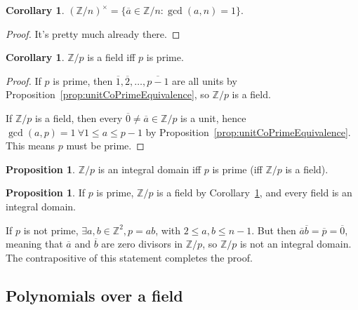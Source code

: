 \documentclass[12pt,a4paper]{article}
\theoremstyle{definition}
\newtheorem{proposition}[definition]{Proposition}
\newtheorem{corollary}[definition]{Corollary}
\begin{document}
\begin{corollary}
	${(\mathbb{Z} / n)}^{\times} = \{ \overline{a} \in \mathbb{Z} / n: \gcd(a, n) = 1 \}$.
\end{corollary}

\begin{proof}
	It's pretty much already there.
\end{proof}

\begin{corollary}\label{cor:primeRemaindersField}
	$\mathbb{Z} / p$ is a field iff $p$ is prime.
\end{corollary}

\begin{proof}
	If $p$ is prime, then $\overline{1}, \overline{2}, \dots, \overline{p - 1}$ are all units by Proposition~\ref{prop:unitCoPrimeEquivalence}, so $\mathbb{Z} / p$ is a field.

	If $\mathbb{Z} / p$ is a field, then every $\overline{0} \ne \overline{a} \in \mathbb{Z} / p$ is a unit, hence $\gcd(a, p) = 1 \ \forall 1 \le a \le p - 1$ by Proposition~\ref{prop:unitCoPrimeEquivalence}. This means $p$ must be prime.
\end{proof}

\begin{proposition}
	$\mathbb{Z} / p$ is an integral domain iff $p$ is prime (iff $\mathbb{Z} / p$ is a field).
\end{proposition}

\begin{proposition}
	If $p$ is prime, $\mathbb{Z} / p$ is a field by Corollary~\ref{cor:primeRemaindersField}, and every field is an integral domain.

	If $p$ is not prime, $\exists a, b \in \mathbb{Z}^2, p = ab$, with $2 \le a, b \le n - 1$. But then $\overline{a} \overline{b} = \overline{p} = \overline{0}$, meaning that $\overline{a}$ and $\overline{b}$ are zero divisors in $\mathbb{Z} / p$, so $\mathbb{Z} / p$ is not an integral domain. The contrapositive of this statement completes the proof.
\end{proposition}

\subsection{Polynomials over a field}
\end{document}
